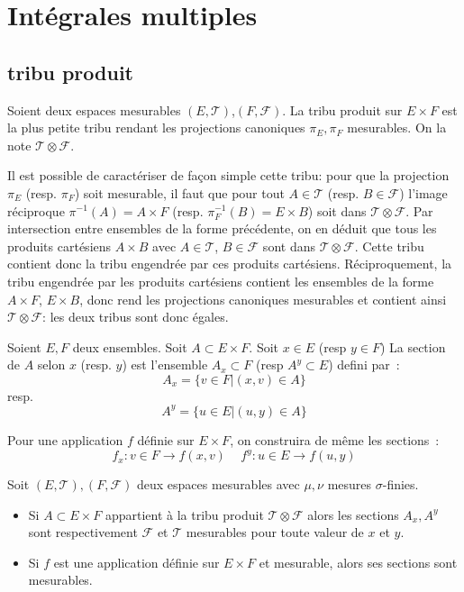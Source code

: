 \chapter{Intégrales multiples}
\section{tribu produit}
\begin{mandatory}
\begin{defn}
Soient deux espaces mesurables $(E, \mathcal{T})$,$(F, \mathcal{F})$. La tribu
produit sur $E\times F$ est la plus petite tribu rendant les projections
canoniques $\pi_E,\pi_F$ mesurables. On la note $\mathcal{T}\otimes
\mathcal{F}$.
\end{defn}
\end{mandatory}
Il est possible de caractériser de façon simple cette tribu: pour que la
projection $\pi_E$ (resp. $\pi_F$) soit mesurable, il faut que pour tout $A \in
\mathcal{T}$ (resp. $B \in \mathcal{F}$) l'image réciproque $\pi^{-1}(A) = A
\times F$ (resp. $\pi_F^{-1}(B) = E \times B$) soit dans $\mathcal{T}\otimes \mathcal{F}$.
Par intersection entre ensembles de la forme précédente, on en déduit que tous
les produits cartésiens $A \times B$ avec $A \in
\mathcal{T}$, $B \in \mathcal{F}$ sont dans $\mathcal{T}\otimes \mathcal{F}$.
Cette tribu contient donc la tribu engendrée par ces produits cartésiens.
Réciproquement, la tribu engendrée par les produits cartésiens contient les
ensembles de la forme $A \times F$, $E \times B$, donc rend les projections
canoniques mesurables et contient ainsi $\mathcal{T}\otimes \mathcal{F}$: les
deux tribus sont donc égales.
\begin{defn}
Soient $E,F$ deux ensembles. Soit $A \subset E \times F$. Soit $x \in
E$ (resp $y \in F$) La section de $A$ selon $x$
(resp. $y$) est l'ensemble $A_x \subset F$ (resp $A^y \subset E$) defini par~:
\[
A_x = \{ v \in F | (x,v) \in A \}
\]
resp.
\[
A^y = \{ u \in E | (u,y) \in A \}
\]
\end{defn}
Pour une application $f$ définie sur $E \times F$, on construira de même
les sections~:
\[
f_x : v \in F  \to f(x,v) \, \quad f^y : u \in E \to f(u,y)
\]
\begin{prop}
Soit $(E, \mathcal{T}), (F, \mathcal{F})$ deux espaces mesurables avec
$\mu,\nu$ mesures $\sigma$-finies. 
\begin{itemize}
\item Si $A \subset E \times F$ appartient à la tribu produit
$\mathcal{T} \otimes \mathcal{F}$ alors les sections $A_x,A^y$ sont
respectivement $\mathcal{F}$ et $\mathcal{T}$ mesurables pour toute
valeur de $x$ et $y$.
\item Si $f$ est une application définie sur $E \times F$ et
mesurable, alors ses sections sont mesurables.
\end{itemize}
\end{prop}
